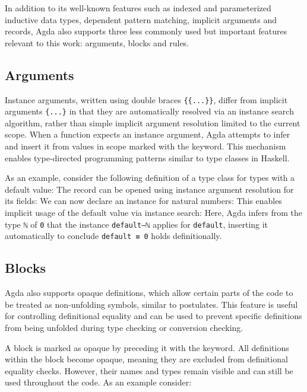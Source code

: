 \documentclass[screen,nonacm]{acmart}
\begin{document}
In addition to its well-known features such as indexed and parameterized
inductive data types, dependent pattern matching, implicit arguments and
records, Agda also supports three less commonly used but important features
relevant to this work:  arguments, 
blocks and  rules.

\subsection*{ Arguments}

Instance arguments, written using double braces \verb|{{...}}|, differ from
implicit arguments \verb|{...}| in that they are automatically resolved via an
instance search algorithm, rather than simple implicit argument resolution
limited to the current scope. When a function expects an instance argument,
Agda attempts to infer and insert it from values in scope marked with the
 keyword. This mechanism enables type-directed
programming patterns similar to type classes in Haskell.

As an example, consider the following definition of a type class for types with
a default value: \EDefault{} The record can be opened using instance argument
resolution for its fields: \EDefFields{} We can now declare an instance for
natural numbers: \EDefInst{} This enables implicit usage of the default value
via instance search: \EDefEx{} Here, Agda infers from the type \verb|ℕ| of
\verb|0| that the instance \verb|default–ℕ| applies for \verb|default|,
inserting it automatically to conclude \verb|default ≡ 0| holds definitionally.

\subsection*{ Blocks}

Agda also supports opaque definitions, which allow certain parts of the code to
be treated as non-unfolding symbols, similar to postulates. This feature is
useful for controlling definitional equality and can be used to prevent
specific definitions from being unfolded during type checking or conversion
checking.

A block is marked as opaque by preceding it with the 
keyword. All definitions within the block become opaque, meaning they are
excluded from definitional equality checks. However, their names and types
remain visible and can still be used throughout the code. As an example
consider: \EOpaque{}
\end{document}
